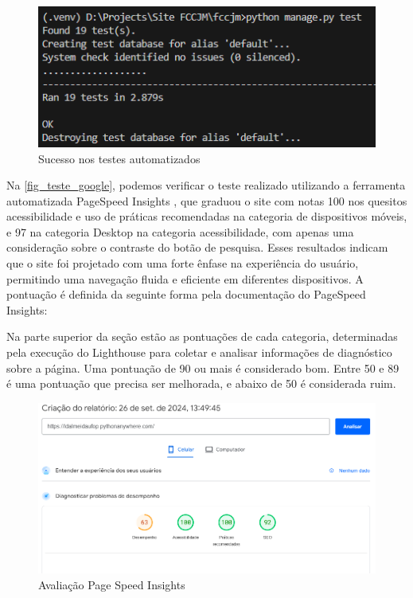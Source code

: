 \begin{figure}[htb] \caption{\label{fig_teste_auto}Sucesso nos testes automatizados } \begin{center} \includegraphics[scale=0.6]{./img/tests.png} \end{center}  \end{figure}

Na \autoref{fig_teste_google}, podemos verificar o teste realizado utilizando a ferramenta automatizada PageSpeed Insights \cite{PageSpeedInsights}, que graduou o site com notas 100 nos quesitos acessibilidade e uso de práticas recomendadas na categoria de dispositivos móveis, e 97 na categoria Desktop na categoria acessibilidade, com apenas uma consideração sobre o contraste do botão de pesquisa. Esses resultados indicam que o site foi projetado com uma forte ênfase na experiência do usuário, permitindo uma navegação fluida e eficiente em diferentes dispositivos. A pontuação é definida da seguinte forma pela documentação do PageSpeed Insights:

\begin{citacao}
    Na parte superior da seção estão as pontuações de cada categoria, determinadas pela execução do Lighthouse para coletar e analisar informações de diagnóstico sobre a página. Uma pontuação de 90 ou mais é considerado bom. Entre 50 e 89 é uma pontuação que precisa ser melhorada, e abaixo de 50 é considerada ruim. \cite{PageSpeedInsightsDocs}
\end{citacao}

\begin{figure}[htb] \caption{\label{fig_teste_google}Avaliação Page Speed Insights} \begin{center} \includegraphics[scale=0.5]{./img/pagespeedinsights.png} \end{center}  \end{figure}

